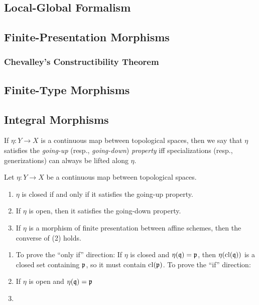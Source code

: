 \documentclass[10pt,final,oneside]{amsbook}
\makeatletter
\renewenvironment{proof}[1][\proofname] 
{ 	
	\par\pushQED{\qed}\normalfont\topsep6\p@\@plus6\p@\relax\trivlist\itemindent\normalparindent
	\item[\hskip\labelsep\itshape#1\@addpunct{.}]\ignorespaces
}
{
	\popQED\endtrivlist\@endpefalse
}
\numberwithin{equation}{section}
\newcommand{\cl}{\mathrm{cl}}
\makeatother
\begin{document}
\subsection{Local-Global Formalism}

\subsection{Finite-Presentation Morphisms}

\subsubsection{Chevalley's Constructibility Theorem}

\subsection{Finite-Type Morphisms}

\subsection{Integral Morphisms}

If $\eta : Y\to X$ is a continuous map between topological spaces, then we say that $\eta$ satisfies the \emph{going-up} (resp., \emph{going-down}) \emph{property} iff specializations (resp., generizations) can always be lifted along $\eta$.

\begin{prop}\label{Going}
Let $\eta : Y \to X$ be a continuous map between topological spaces.
\begin{enumerate}
\item 	$\eta$ is closed if and only if it satisfies the going-up property.
\item 	If $\eta$ is open, then it satisfies the going-down property.
\item 	If $\eta$ is a morphism of finite presentation between affine schemes, then the converse of (2) holds.
\end{enumerate}
\end{prop}

\begin{proof}\mbox{}
\begin{enumerate}
\item 	To prove the ``only if'' direction:
			If $\eta$ is closed and $\eta(\mathfrak{q}) = \mathfrak{p}$, then $\eta(\cl(\fr{q}))$ is a closed set containing $\mathfrak{p}$, so it must contain $\cl(\fr{p})$.
			To prove the ``if'' direction:
\item 	If $\eta$ is open and $\eta(\mathfrak{q}) = \mathfrak{p}$
\item 	\qedhere
\end{enumerate}
\end{proof}
\end{document}
